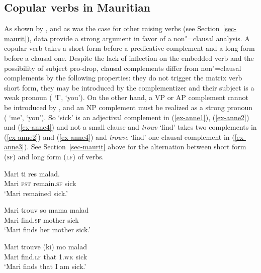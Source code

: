 \subsection{Copular verbs in Mauritian}

As shown by \citet{HenriandLaurens2011}, and as was the case for other raising verbs (see Section~\ref{sec-maurit}),  data
provide a strong argument in favor of a non"=clausal analysis.
A copular verb takes a short form before a
predicative complement and
a long form before a clausal one. Despite the lack of inflection on the embedded verb and the
possibility of subject pro-drop, clausal complements differ from non"=clausal complements by the
following properties: they do not trigger the matrix verb short form, they may be introduced by
the complementizer  and their subject is a weak pronoun ( `I',  `you'). On
the other hand, a VP or AP complement cannot be introduced by , and an NP complement must
be realized as a strong pronoun
( `me',  `you'). So  `sick' is an adjectival complement in
(\ref{ex-anne1}), (\ref{ex-anne2}) and (\ref{ex-anne4}) and not a small clause and \emph{trouv} `find' takes
two complements in (\ref{ex-anne2}) and (\ref{ex-anne4}) and \emph{trouve} `find' one clausal complement in (\ref{ex-anne3}). See Section~\ref{sec-maurit}
above for the alternation between short form (\textsc{sf}) and long form (\textsc{lf}) of verbs.

\eal
\ex 
\gll Mari ti res  malad.\\
     Mari \textsc{pst} remain.\textsc{sf} sick\\\hfill\citep[]{HenriandLaurens2011}
\glt `Mari remained sick.' \label{ex-anne1}

\ex 
\gll Mari trouv  so mama malad\\
     Mari find.\textsc{sf} \POSS{} mother sick\\
\glt `Mari finds her mother sick.' \label{ex-anne2}

\ex 
\gll Mari trouve (ki) mo malad\\
     Mari find.\textsc{lf} \hphantom{(}that 1\SG.\textsc{wk} sick\\
\glt `Mari finds that I am sick.' \label{ex-anne3}

